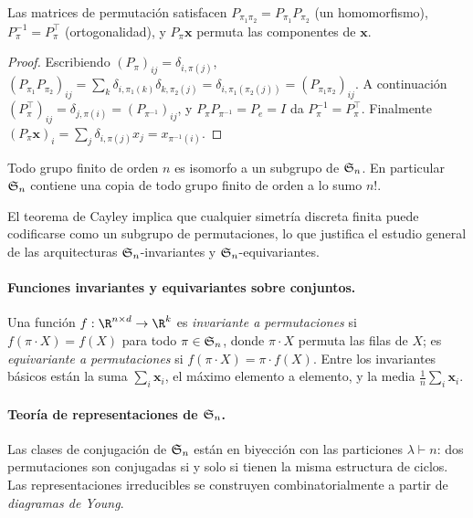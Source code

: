 \begin{proposition}
\label{prop:groups:permutation-matrix-properties}
Las matrices de permutaci\'on satisfacen $P_{\pi_1 \pi_2} = P_{\pi_1} P_{\pi_2}$
(un homomorfismo), $P_\pi^{-1} = P_\pi^\top$ (ortogonalidad), y $P_\pi \mathbf{x}$
permuta las componentes de $\mathbf{x}$.
\end{proposition}

\begin{proof}
Escribiendo $(P_\pi)_{ij} = \delta_{i, \pi(j)}$, $(P_{\pi_1} P_{\pi_2})_{ij} =
\sum_k \delta_{i, \pi_1(k)} \delta_{k, \pi_2(j)} = \delta_{i, \pi_1(\pi_2(j))} =
(P_{\pi_1 \pi_2})_{ij}$. A continuaci\'on $(P_\pi^\top)_{ij} = \delta_{j, \pi(i)}
= (P_{\pi^{-1}})_{ij}$, y $P_\pi P_{\pi^{-1}} = P_e = I$ da $P_\pi^{-1} =
P_\pi^\top$. Finalmente $(P_\pi \mathbf{x})_i = \sum_j \delta_{i, \pi(j)} x_j =
x_{\pi^{-1}(i)}$.
\end{proof}

\begin{theorem}
\label{thm:groups:cayley}
Todo grupo finito de orden $n$ es isomorfo a un subgrupo de $\mathfrak{S}_n$. En
particular $\mathfrak{S}_n$ contiene una copia de todo grupo finito de orden a lo sumo
$n!$.
\end{theorem}

El teorema de Cayley implica que cualquier simetr\'ia discreta finita puede
codificarse como un subgrupo de permutaciones, lo que justifica el estudio
general de las arquitecturas $\mathfrak{S}_n$-invariantes y $\mathfrak{S}_n$-equivariantes.

\paragraph{Funciones invariantes y equivariantes sobre conjuntos.}
Una funci\'on $f: \R^{n \times d} \to \R^k$ es \emph{invariante a permutaciones}
si $f(\pi \cdot X) = f(X)$ para todo $\pi \in \mathfrak{S}_n$, donde $\pi \cdot X$
permuta las filas de $X$; es \emph{equivariante a permutaciones} si $f(\pi \cdot
X) = \pi \cdot f(X)$. Entre los invariantes b\'asicos est\'an la suma $\sum_i
\mathbf{x}_i$, el m\'aximo elemento a elemento, y la media $\tfrac{1}{n}\sum_i
\mathbf{x}_i$.

\paragraph{Teor\'ia de representaciones de $\mathfrak{S}_n$.}
Las clases de conjugaci\'on de $\mathfrak{S}_n$ est\'an en biyecci\'on con las
particiones $\lambda \vdash n$: dos permutaciones son conjugadas si y solo si
tienen la misma estructura de ciclos. Las representaciones irreducibles se
construyen combinatorialmente a partir de \emph{diagramas de Young}.

